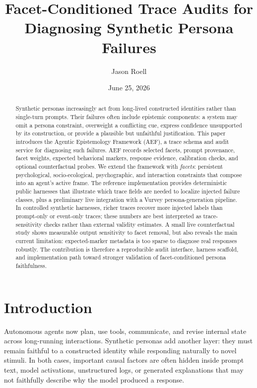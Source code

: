 \documentclass[10pt,a4paper]{article}
\title{Facet-Conditioned Trace Audits for Diagnosing Synthetic Persona Failures}
\author{Jason Roell}
\date{June 25, 2026}
\newcommand{\method}{AEF}
\begin{document}
\maketitle

\begin{abstract}
Synthetic personas increasingly act from long-lived constructed identities rather than single-turn prompts. Their failures often include epistemic components: a system may omit a persona constraint, overweight a conflicting cue, express confidence unsupported by its construction, or provide a plausible but unfaithful justification. This paper introduces the Agentic Epistemology Framework (\method), a trace schema and audit service for diagnosing such failures. \method{} records selected facets, prompt provenance, facet weights, expected behavioral markers, response evidence, calibration checks, and optional counterfactual probes. We extend the framework with \emph{facets}: persistent psychological, socio-ecological, psychographic, and interaction constraints that compose into an agent's active frame. The reference implementation provides deterministic public harnesses that illustrate which trace fields are needed to localize injected failure classes, plus a preliminary live integration with a Vurvey persona-generation pipeline. In controlled synthetic harnesses, richer traces recover more injected labels than prompt-only or event-only traces; these numbers are best interpreted as trace-sensitivity checks rather than external validity estimates. A small live counterfactual study shows measurable output sensitivity to facet removal, but also reveals the main current limitation: expected-marker metadata is too sparse to diagnose real responses robustly. The contribution is therefore a reproducible audit interface, harness scaffold, and implementation path toward stronger validation of facet-conditioned persona faithfulness.
\end{abstract}

\section{Introduction}
Autonomous agents now plan, use tools, communicate, and revise internal state across long-running interactions. Synthetic personas add another layer: they must remain faithful to a constructed identity while responding naturally to novel stimuli. In both cases, important causal factors are often hidden inside prompt text, model activations, unstructured logs, or generated explanations that may not faithfully describe why the model produced a response.
\end{document}
